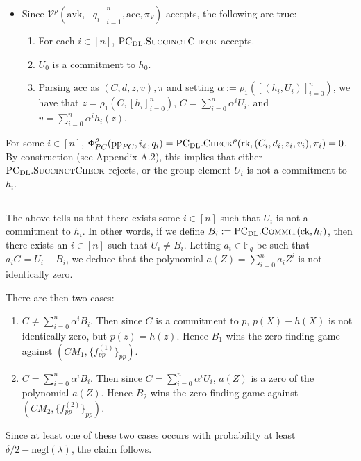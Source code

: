 \documentclass[
]{article}
\providecommand{\tightlist}{%
  \setlength{\itemsep}{0pt}\setlength{\parskip}{0pt}}
\newcommand*{\Commit}{\mathrm{\text{C{\scriptsize OMMIT}}}}
\newcommand*{\PCDL}{\text{PC}_{\text{DL}}}
\newcommand*{\PCDLCommit}{\PCDL.\Commit}
\newcommand*{\PCDLSuccinctCheck}{\PCDL.\mathrm{\text{S{\scriptsize UCCINCT}C{\scriptsize HECK}}}}
\newcommand*{\PCDLCheck}{\PCDL.\mathrm{\text{C\scriptsize HECK}}}
\begin{document}
\begin{itemize}
\tightlist
\item
  Since
  \(\mathcal{V}^\rho(\text{avk}, [q_i]_{i=1}^n, \text{acc}, \pi_V)\)
  accepts, the following are true:

  \begin{enumerate}
  \def\labelenumi{\arabic{enumi}.}
  \tightlist
  \item
    For each \(i \in [n]\), \(\PCDLSuccinctCheck\) accepts.
  \item
    \(U_0\) is a commitment to \(h_0\).
  \item
    Parsing \(\text{acc}\) as \((C, d, z, v), \pi\) and setting
    \(\alpha :=
    \rho_1([(h_i, U_i)]_{i=0}^n)\), we have that
    \(z = \rho_1(C, [h_i]_{i=0}^n)\), \(C = \sum_{i=0}^n \alpha^i U_i\),
    and \(v = \sum_{i=0}^n \alpha^i h_i(z)\).
  \end{enumerate}
\end{itemize}

For some \(i \in [n]\), \(\Phi_{PC}^\rho(\text{pp}_{PC}, i_\phi, q_i)
= \PCDLCheck^\rho(\text{rk}, (C_i, d_i, z_i, v_i), \pi_i)
= 0\). By construction (see Appendix A.2), this implies that either
\(\PCDLSuccinctCheck\) rejects, or the group element \(U_i\) is not a
commitment to \(h_i\).

\begin{center}\rule{0.5\linewidth}{0.5pt}\end{center}

The above tells us that there exists some \(i \in [n]\) such that
\(U_i\) is not a commitment to \(h_i\). In other words, if we define
\(B_i :=
\PCDLCommit(\text{ck}, h_i)\), then there exists an \(i \in [n]\) such
that \(U_i \neq B_i\). Letting \(a_i \in \mathbb{F}_q\) be such that
\(a_i
G = U_i - B_i\), we deduce that the polynomial
\(a(Z) = \sum_{i=0}^n a_i Z^i\) is not identically zero.

There are then two cases:

\begin{enumerate}
\def\labelenumi{\arabic{enumi}.}
\item
  \(C \neq \sum_{i=0}^n \alpha^i B_i\). Then since \(C\) is a commitment
  to \(p\), \(p(X) - h(X)\) is not identically zero, but
  \(p(z) = h(z)\). Hence \(B_1\) wins the zero-finding game against
  \((CM_1, \{f_{pp}^{(1)}\}_{pp})\).
\item
  \(C = \sum_{i=0}^n \alpha^i B_i\). Then since
  \(C = \sum_{i=0}^n \alpha^i U_i\), \(a(Z)\) is a zero of the
  polynomial \(a(Z)\). Hence \(B_2\) wins the zero-finding game against
  \((CM_2, \{f_{pp}^{(2)}\}_{pp})\).
\end{enumerate}

Since at least one of these two cases occurs with probability at least
\(\delta / 2 - \text{negl}(\lambda)\), the claim follows.
\end{document}
